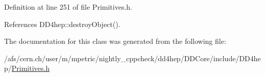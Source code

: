Definition at line 251 of file Primitives.\+h.



References D\+D4hep\+::destroy\+Object().



The documentation for this class was generated from the following file\+:\begin{DoxyCompactItemize}
\item 
/afs/cern.\+ch/user/m/mpetric/nightly\+\_\+cppcheck/dd4hep/\+D\+D\+Core/include/\+D\+D4hep/\hyperlink{_primitives_8h}{Primitives.\+h}\end{DoxyCompactItemize}
